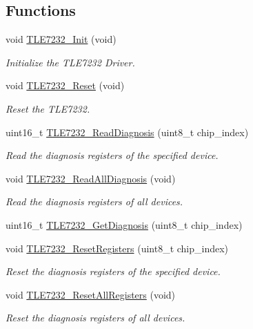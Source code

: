 \subsection*{Functions}
\begin{DoxyCompactItemize}
\item 
void \hyperlink{group__tle7232__driver_ga97ef893379ebeb042e738b4cecfa8bff}{T\-L\-E7232\-\_\-\-Init} (void)
\begin{DoxyCompactList}\small\item\em Initialize the T\-L\-E7232 Driver. \end{DoxyCompactList}\item 
void \hyperlink{group__tle7232__driver_ga307b487187274ea82fd8f1674a0e2d3c}{T\-L\-E7232\-\_\-\-Reset} (void)
\begin{DoxyCompactList}\small\item\em Reset the T\-L\-E7232. \end{DoxyCompactList}\item 
uint16\-\_\-t \hyperlink{group__tle7232__driver_ga82fd3520b4ff7c04460d6e37490a29eb}{T\-L\-E7232\-\_\-\-Read\-Diagnosis} (uint8\-\_\-t chip\-\_\-index)
\begin{DoxyCompactList}\small\item\em Read the diagnosis registers of the specified device. \end{DoxyCompactList}\item 
void \hyperlink{group__tle7232__driver_gadefac9d800f68f872c6c8c4d5b3379cd}{T\-L\-E7232\-\_\-\-Read\-All\-Diagnosis} (void)
\begin{DoxyCompactList}\small\item\em Read the diagnosis registers of all devices. \end{DoxyCompactList}\item 
uint16\-\_\-t \hyperlink{group__tle7232__driver_ga70b056c53eb119997811f7d942007109}{T\-L\-E7232\-\_\-\-Get\-Diagnosis} (uint8\-\_\-t chip\-\_\-index)
\item 
void \hyperlink{group__tle7232__driver_ga5b83ed93b7c747534e40c3b6a0cd994e}{T\-L\-E7232\-\_\-\-Reset\-Registers} (uint8\-\_\-t chip\-\_\-index)
\begin{DoxyCompactList}\small\item\em Reset the diagnosis registers of the specified device. \end{DoxyCompactList}\item 
void \hyperlink{group__tle7232__driver_gac27a30e4da66392e2a53b1414aa3c9cb}{T\-L\-E7232\-\_\-\-Reset\-All\-Registers} (void)
\begin{DoxyCompactList}\small\item\em Reset the diagnosis registers of all devices. \end{DoxyCompactList}\item 

\end{DoxyCompactItemize}
